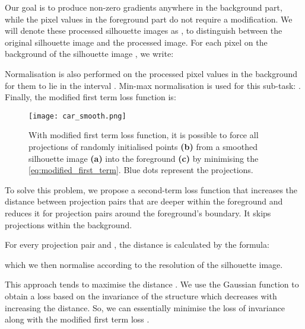 \documentclass[runningheads]{llncs}
\begin{document}
Our goal is to produce non-zero gradients anywhere in the background part, while the pixel values in the foreground part do not require a modification. We will denote these processed silhouette images as , to distinguish between the original silhouette image  and the processed image. For each pixel  on the background of the silhouette image , we write:



Normalisation is also performed on the processed pixel values in the background for them to lie in the interval .  Min-max normalisation is used for this sub-task: . Finally, the modified first term loss function is:



\begin{figure*}[h]
\centering
\setlength{\abovecaptionskip}{3pt}
 \texttt{[image: car\_smooth.png]}
 \caption{With modified first term loss function, it is possible to force all projections of randomly initialised points \textbf{(b)} from a smoothed silhouette image \textbf{(a)} into the foreground \textbf{(c)} by minimising the \eqref{eq:modified_first_term}. Blue dots represent the projections.} 
\label{fig:car_smooth}
\end{figure*}


To solve this problem, we propose a second-term loss function that increases the distance between projection pairs that are deeper within the foreground and reduces it for projection pairs around the foreground's boundary. It skips projections within the background.

For every projection pair  and , the  distance is calculated by the formula: 

which we then normalise according to the resolution of the silhouette image. 

This approach tends to maximise the distance . We use the Gaussian function \cite{li2019inverse} to obtain a loss based on the invariance of the structure which decreases with increasing the distance. So, we can essentially minimise the loss of invariance along with the modified first term loss .
\end{document}
